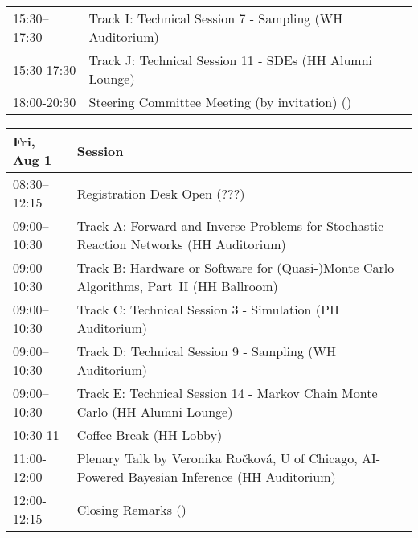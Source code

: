 \begin{table}
{\begin{tabularx}{\textwidth}{>{\hsize=0.32\hsize}X|>{\hsize=1.7\hsize}X}
\cellcolor{\SessionLightColor}15:30–17:30 & \cellcolor{\SessionLightColor}Track I: Technical Session 7 - Sampling (WH Auditorium) \\
\cellcolor{\SessionLightColor}15:30-17:30 & \cellcolor{\SessionLightColor}Track J: Technical Session 11 - SDEs (HH Alumni Lounge) \\
\cellcolor{\SessionTitleColor}18:00-20:30 & \cellcolor{\SessionTitleColor}Steering Committee Meeting (by invitation) () \\
\hline
\end{tabularx}
}
\end{table}

\begin{table}
{\footnotesize
\begin{tabularx}{\textwidth}{>{\hsize=0.32\hsize}X|>{\hsize=1.7\hsize}X}
\hline
\textbf{Fri, Aug 1} & \textbf{Session} \\
\hline
\cellcolor{\EmptyColor}08:30–12:15 & \cellcolor{\EmptyColor}Registration Desk Open (???) \\
\cellcolor{\SessionTitleColor}09:00–10:30 & \cellcolor{\SessionTitleColor}Track A: Forward and Inverse Problems for Stochastic Reaction Networks (HH Auditorium) \\
\cellcolor{\SessionTitleColor}09:00–10:30 & \cellcolor{\SessionTitleColor}Track B: Hardware or Software for (Quasi-)Monte Carlo Algorithms, Part~II (HH Ballroom) \\
\cellcolor{\SessionLightColor}09:00–10:30 & \cellcolor{\SessionLightColor}Track C: Technical Session 3 - Simulation (PH Auditorium) \\
\cellcolor{\SessionLightColor}09:00–10:30 & \cellcolor{\SessionLightColor}Track D: Technical Session 9 - Sampling (WH Auditorium) \\
\cellcolor{\SessionLightColor}09:00–10:30 & \cellcolor{\SessionLightColor}Track E: Technical Session 14 - Markov Chain Monte Carlo (HH Alumni Lounge) \\
\cellcolor{\EmptyColor}10:30-11 & \cellcolor{\EmptyColor}Coffee Break (HH Lobby) \\
\cellcolor{\PlenaryColor}11:00-12:00 & \cellcolor{\PlenaryColor}Plenary Talk by Veronika Ročková, U of Chicago, AI-Powered Bayesian Inference (HH Auditorium) \\
\cellcolor{\PlenaryColor}12:00-12:15 & \cellcolor{\PlenaryColor}Closing Remarks () \\
\hline
\end{tabularx}
}
\end{table}


